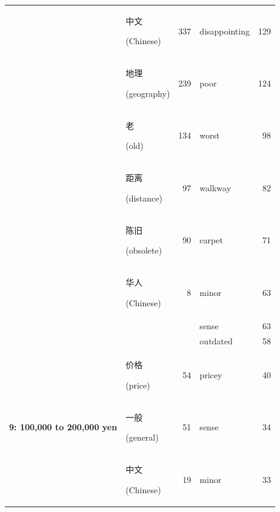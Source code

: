 \documentclass[smallextended,natbib]{svjour3}       %
\begin{document}
\begin{table}[ht]
{\begin{tabular}{|c|lr|lr|}
                                                             & \begin{CJK}{UTF8}{gbsn}中文\end{CJK} (Chinese)   & 337  & disappointing  & 129 \\  
                                                             & \begin{CJK}{UTF8}{gbsn}地理\end{CJK} (geography) & 239  & poor           & 124 \\  
                                                             & \begin{CJK}{UTF8}{gbsn}老\end{CJK} (old)        & 134  & worst          & 98  \\  
                                                             & \begin{CJK}{UTF8}{gbsn}距离\end{CJK} (distance)  & 97   & walkway        & 82  \\  
                                                             & \begin{CJK}{UTF8}{gbsn}陈旧\end{CJK} (obsolete)  & 90   & carpet         & 71  \\  
                                                             & \begin{CJK}{UTF8}{gbsn}华人\end{CJK} (Chinese)   & 8    & minor          & 63  \\  
                                                             &                                                &      & sense          & 63  \\  
                                                             &                                                &      & outdated       & 58  \\ \hline
        \multirow{10}{*}{\textbf{9: 100,000 to 200,000 yen}} & \begin{CJK}{UTF8}{gbsn}价格\end{CJK} (price)     & 54   & pricey         & 40  \\  
                                                             & \begin{CJK}{UTF8}{gbsn}一般\end{CJK} (general)   & 51   & sense          & 34  \\  
                                                             & \begin{CJK}{UTF8}{gbsn}中文\end{CJK} (Chinese)   & 19   & minor          & 33  \\  

\end{tabular}}
\end{table}
\end{document}
